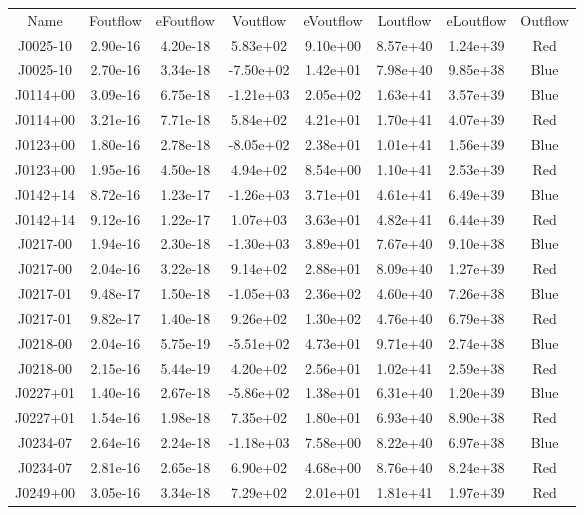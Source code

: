 \begin{table}
\begin{tabular}{cccccccc}
Name & Foutflow & eFoutflow & Voutflow & eVoutflow & Loutflow & eLoutflow & Outflow \\
J0025-10 & 2.90e-16 & 4.20e-18 & 5.83e+02 & 9.10e+00 & 8.57e+40 & 1.24e+39 & Red \\
J0025-10 & 2.70e-16 & 3.34e-18 & -7.50e+02 & 1.42e+01 & 7.98e+40 & 9.85e+38 & Blue \\
J0114+00 & 3.09e-16 & 6.75e-18 & -1.21e+03 & 2.05e+02 & 1.63e+41 & 3.57e+39 & Blue \\
J0114+00 & 3.21e-16 & 7.71e-18 & 5.84e+02 & 4.21e+01 & 1.70e+41 & 4.07e+39 & Red \\
J0123+00 & 1.80e-16 & 2.78e-18 & -8.05e+02 & 2.38e+01 & 1.01e+41 & 1.56e+39 & Blue \\
J0123+00 & 1.95e-16 & 4.50e-18 & 4.94e+02 & 8.54e+00 & 1.10e+41 & 2.53e+39 & Red \\
J0142+14 & 8.72e-16 & 1.23e-17 & -1.26e+03 & 3.71e+01 & 4.61e+41 & 6.49e+39 & Blue \\
J0142+14 & 9.12e-16 & 1.22e-17 & 1.07e+03 & 3.63e+01 & 4.82e+41 & 6.44e+39 & Red \\
J0217-00 & 1.94e-16 & 2.30e-18 & -1.30e+03 & 3.89e+01 & 7.67e+40 & 9.10e+38 & Blue \\
J0217-00 & 2.04e-16 & 3.22e-18 & 9.14e+02 & 2.88e+01 & 8.09e+40 & 1.27e+39 & Red \\
J0217-01 & 9.48e-17 & 1.50e-18 & -1.05e+03 & 2.36e+02 & 4.60e+40 & 7.26e+38 & Blue \\
J0217-01 & 9.82e-17 & 1.40e-18 & 9.26e+02 & 1.30e+02 & 4.76e+40 & 6.79e+38 & Red \\
J0218-00 & 2.04e-16 & 5.75e-19 & -5.51e+02 & 4.73e+01 & 9.71e+40 & 2.74e+38 & Blue \\
J0218-00 & 2.15e-16 & 5.44e-19 & 4.20e+02 & 2.56e+01 & 1.02e+41 & 2.59e+38 & Red \\
J0227+01 & 1.40e-16 & 2.67e-18 & -5.86e+02 & 1.38e+01 & 6.31e+40 & 1.20e+39 & Blue \\
J0227+01 & 1.54e-16 & 1.98e-18 & 7.35e+02 & 1.80e+01 & 6.93e+40 & 8.90e+38 & Red \\
J0234-07 & 2.64e-16 & 2.24e-18 & -1.18e+03 & 7.58e+00 & 8.22e+40 & 6.97e+38 & Blue \\
J0234-07 & 2.81e-16 & 2.65e-18 & 6.90e+02 & 4.68e+00 & 8.76e+40 & 8.24e+38 & Red \\
J0249+00 & 3.05e-16 & 3.34e-18 & 7.29e+02 & 2.01e+01 & 1.81e+41 & 1.97e+39 & Red \\

\end{tabular}
\end{table}
